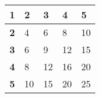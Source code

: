 \begin{table}[htbp]
\centering
\begin{tabular}{|l|l|l|l|l|}
\hline
\textbf{1} & \textbf{2} & \textbf{3} & \textbf{4} & \textbf{5} \\ \hline
\textbf{2} & 4          & 6          & 8          & 10         \\ \hline
\textbf{3} & 6          & 9          & 12         & 15         \\ \hline
\textbf{4} & 8          & 12         & 16         & 20         \\ \hline
\textbf{5} & 10         & 15         & 20         & 25         \\ \hline
\end{tabular}
\label{tab:f2_multiplication_table}
\end{table}